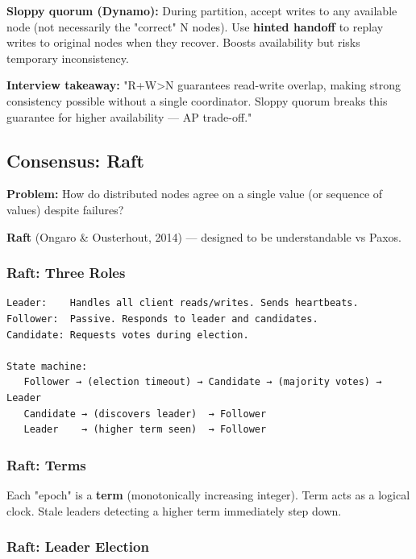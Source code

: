 \documentclass[11pt]{article}
\begin{document}
\textbf{Sloppy quorum (Dynamo):} During partition, accept writes to any available node (not necessarily the "correct" N nodes). Use \textbf{hinted handoff} to replay writes to original nodes when they recover. Boosts availability but risks temporary inconsistency.

\textbf{Interview takeaway:} "R+W\textgreater N guarantees read-write overlap, making strong consistency possible without a single coordinator. Sloppy quorum breaks this guarantee for higher availability --- AP trade-off."

\subsection{Consensus: Raft}\label{consensus-raft}

\textbf{Problem:} How do distributed nodes agree on a single value (or sequence of values) despite failures?

\textbf{Raft} (Ongaro \& Ousterhout, 2014) --- designed to be understandable vs Paxos.

\subsubsection{Raft: Three Roles}\label{raft-three-roles}

\setcodelang{}

\begin{verbatim}
Leader:    Handles all client reads/writes. Sends heartbeats.
Follower:  Passive. Responds to leader and candidates.
Candidate: Requests votes during election.

State machine:
   Follower → (election timeout) → Candidate → (majority votes) → Leader
   Candidate → (discovers leader)  → Follower
   Leader    → (higher term seen)  → Follower
\end{verbatim}

\subsubsection{Raft: Terms}\label{raft-terms}

Each "epoch" is a \textbf{term} (monotonically increasing integer). Term acts as a logical clock. Stale leaders detecting a higher term immediately step down.

\subsubsection{Raft: Leader Election}\label{raft-leader-election}
\end{document}
